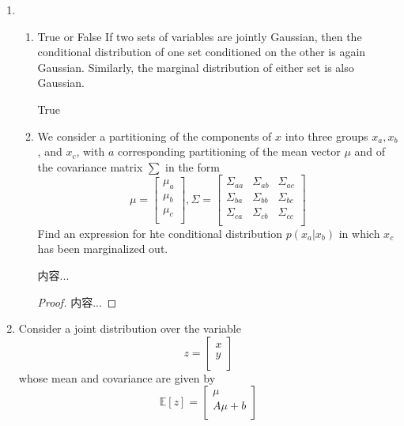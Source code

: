 \documentclass[a4paper]{article}
\begin{document}
	\courseheader
	\begin{enumerate}
		\setlength{\itemsep}{3\parskip}
		
		\item
		\begin{enumerate}
			\item
			True or False If two sets of variables are jointly Gaussian, then the conditional distribution of one set conditioned on the other is again Gaussian. Similarly, the marginal distribution of either set is also Gaussian.
			\begin{solution}
				True
			\end{solution}
			\item
			We consider a partitioning of the components of $x$ into three groups $x_a,x_b$, and $x_c$, with $a$ corresponding partitioning of the mean vector $\mu$ and of the covariance matrix $\sum$ in the form
			$$\mu=\begin{bmatrix}
			\mu_a\\
			\mu_b\\
			\mu_c\\
			\end{bmatrix}
			,
			\Sigma=\begin{bmatrix}
			\Sigma_{aa} & \Sigma_{ab} & \Sigma_{ac}\\
			\Sigma_{ba} & \Sigma_{bb} & \Sigma_{bc}\\
			\Sigma_{ca} & \Sigma_{cb} & \Sigma_{cc}\\
			\end{bmatrix}
			$$
			Find an expression for hte conditional distribution $p(x_a|x_b)$ in which $x_c$ has been marginalized out.
			\begin{solution}
				内容...
			\end{solution}
			\begin{proof}
				内容...
			\end{proof}
		\end{enumerate}
		\item
		Consider a joint distribution over the variable
		$$
		z=\begin{bmatrix}
		x\\
		y\\
		\end{bmatrix}
		$$
		whose mean and covariance are given by
		$$
		\mathbb{E}[z]=\begin{bmatrix}
		\mu\\
		A\mu+b\\
		\end{bmatrix}
$$
\end{enumerate}
\end{document}
